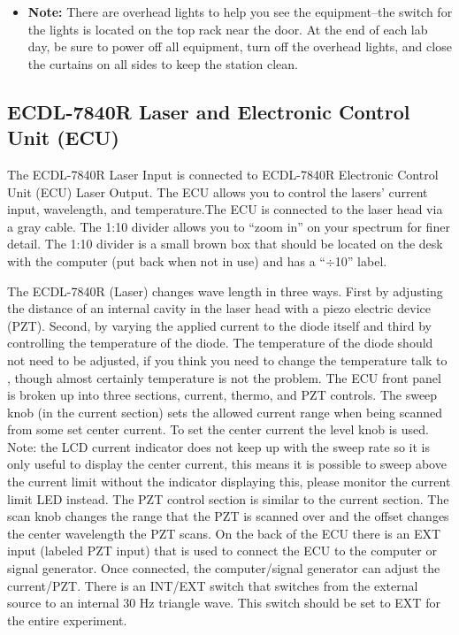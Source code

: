 \documentclass{../lab}
\begin{document}
\begin{itemize}
    \item \textbf{Note:} There are overhead lights to help you see the equipment--the switch for the lights is located on the top rack near the door. At the end of each lab day, be sure to power off all equipment, turn off the overhead lights, and close the curtains on all sides to keep the station clean.

\end{itemize}

\subsection{ECDL-7840R Laser and Electronic Control Unit (ECU)}
\label{subsec:ECDL7840RLaser}

The ECDL-7840R Laser Input is connected to ECDL-7840R Electronic Control Unit (ECU) Laser Output. The ECU allows you to control the lasers' current input, wavelength, and temperature.The ECU is connected to the laser head via a gray cable. The 1:10 divider allows you to ``zoom in'' on your spectrum for finer detail. The 1:10 divider is a small brown box that should be located on the desk with the computer (put back when not in use) and has a ``$\div$10'' label.

The ECDL-7840R (Laser) changes wave length in three ways. First by adjusting the distance of an internal cavity in the laser head with a piezo electric device (PZT). Second, by varying the applied current to the diode itself and third by controlling the temperature of the diode. The temperature of the diode should not need to be adjusted, if you think you need to change the temperature talk to \LabEngineer, though almost certainly temperature is not the problem. The ECU front panel is broken up into three sections, current, thermo, and PZT controls. The sweep knob (in the current section) sets the allowed current range when being scanned from some set center current. To set the center current the level knob is used. Note: the LCD current indicator does not keep up with the sweep rate so it is only useful to display the center current, this means it is possible to sweep above the current limit without the indicator displaying this, please monitor the current limit LED instead. The PZT control section is similar to the current section. The scan knob changes the range that the PZT is scanned over and the offset changes the center wavelength the PZT scans. On the back of the ECU there is an EXT input (labeled PZT input) that is used to connect the ECU to the computer or signal generator. Once connected, the computer/signal generator can adjust the current/PZT. There is an INT/EXT switch that switches from the external source to an internal 30 Hz triangle wave. This switch should be set to EXT for the entire experiment.
\end{document}
